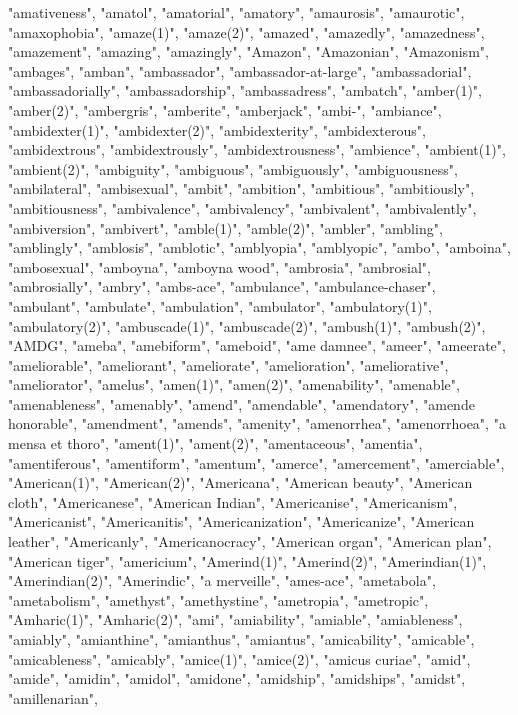 "amativeness",
"amatol",
"amatorial",
"amatory",
"amaurosis",
"amaurotic",
"amaxophobia",
"amaze(1)",
"amaze(2)",
"amazed",
"amazedly",
"amazedness",
"amazement",
"amazing",
"amazingly",
"Amazon",
"Amazonian",
"Amazonism",
"ambages",
"amban",
"ambassador",
"ambassador-at-large",
"ambassadorial",
"ambassadorially",
"ambassadorship",
"ambassadress",
"ambatch",
"amber(1)",
"amber(2)",
"ambergris",
"amberite",
"amberjack",
"ambi-",
"ambiance",
"ambidexter(1)",
"ambidexter(2)",
"ambidexterity",
"ambidexterous",
"ambidextrous",
"ambidextrously",
"ambidextrousness",
"ambience",
"ambient(1)",
"ambient(2)",
"ambiguity",
"ambiguous",
"ambiguously",
"ambiguousness",
"ambilateral",
"ambisexual",
"ambit",
"ambition",
"ambitious",
"ambitiously",
"ambitiousness",
"ambivalence",
"ambivalency",
"ambivalent",
"ambivalently",
"ambiversion",
"ambivert",
"amble(1)",
"amble(2)",
"ambler",
"ambling",
"amblingly",
"amblosis",
"amblotic",
"amblyopia",
"amblyopic",
"ambo",
"amboina",
"ambosexual",
"amboyna",
"amboyna wood",
"ambrosia",
"ambrosial",
"ambrosially",
"ambry",
"ambs-ace",
"ambulance",
"ambulance-chaser",
"ambulant",
"ambulate",
"ambulation",
"ambulator",
"ambulatory(1)",
"ambulatory(2)",
"ambuscade(1)",
"ambuscade(2)",
"ambush(1)",
"ambush(2)",
"AMDG",
"ameba",
"amebiform",
"ameboid",
"ame damnee",
"ameer",
"ameerate",
"ameliorable",
"ameliorant",
"ameliorate",
"amelioration",
"ameliorative",
"ameliorator",
"amelus",
"amen(1)",
"amen(2)",
"amenability",
"amenable",
"amenableness",
"amenably",
"amend",
"amendable",
"amendatory",
"amende honorable",
"amendment",
"amends",
"amenity",
"amenorrhea",
"amenorrhoea",
"a mensa et thoro",
"ament(1)",
"ament(2)",
"amentaceous",
"amentia",
"amentiferous",
"amentiform",
"amentum",
"amerce",
"amercement",
"amerciable",
"American(1)",
"American(2)",
"Americana",
"American beauty",
"American cloth",
"Americanese",
"American Indian",
"Americanise",
"Americanism",
"Americanist",
"Americanitis",
"Americanization",
"Americanize",
"American leather",
"Americanly",
"Americanocracy",
"American organ",
"American plan",
"American tiger",
"americium",
"Amerind(1)",
"Amerind(2)",
"Amerindian(1)",
"Amerindian(2)",
"Amerindic",
"a merveille",
"ames-ace",
"ametabola",
"ametabolism",
"amethyst",
"amethystine",
"ametropia",
"ametropic",
"Amharic(1)",
"Amharic(2)",
"ami",
"amiability",
"amiable",
"amiableness",
"amiably",
"amianthine",
"amianthus",
"amiantus",
"amicability",
"amicable",
"amicableness",
"amicably",
"amice(1)",
"amice(2)",
"amicus curiae",
"amid",
"amide",
"amidin",
"amidol",
"amidone",
"amidship",
"amidships",
"amidst",
"amillenarian",
